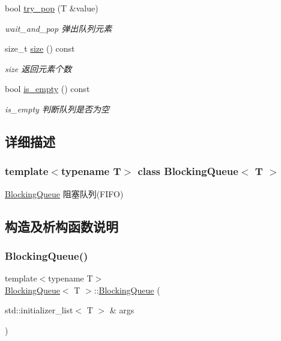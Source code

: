 \begin{DoxyCompactItemize}
bool \hyperlink{classBlockingQueue_a47a2d7726112b4e2d7b3f65a4e84aa06}{try\+\_\+pop} (T \&value)
\begin{DoxyCompactList}\small\item\em wait\+\_\+and\+\_\+pop 弹出队列元素 \end{DoxyCompactList}\item 
size\+\_\+t \hyperlink{classBlockingQueue_a733361d5721c6ba64af3e129921c43b0}{size} () const
\begin{DoxyCompactList}\small\item\em size 返回元素个数 \end{DoxyCompactList}\item 
bool \hyperlink{classBlockingQueue_a06f9211f5225bb6413f403e8d14ca7ce}{is\+\_\+empty} () const
\begin{DoxyCompactList}\small\item\em is\+\_\+empty 判断队列是否为空 \end{DoxyCompactList}\end{DoxyCompactItemize}


\subsection{详细描述}
\subsubsection*{template$<$typename T$>$\newline
class Blocking\+Queue$<$ T $>$}

\hyperlink{classBlockingQueue}{Blocking\+Queue} 阻塞队列(\+F\+I\+F\+O) 

\subsection{构造及析构函数说明}
\mbox{\label{classBlockingQueue_a265931efcceccd5c99ac76178507559b}} 
\subsubsection{\texorpdfstring{Blocking\+Queue()}{BlockingQueue()}\hspace{0.1cm}{\footnotesize\ttfamily [1/3]}}
{\footnotesize\ttfamily template$<$typename T$>$ \\
\hyperlink{classBlockingQueue}{Blocking\+Queue}$<$ T $>$\+::\hyperlink{classBlockingQueue}{Blocking\+Queue} (\begin{DoxyParamCaption}\item[{std\+::initializer\+\_\+list$<$ T $>$ \&}]{args }\end{DoxyParamCaption})\hspace{0.3cm}{\ttfamily [inline]}}



